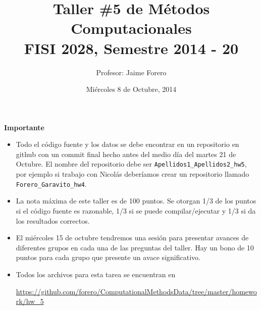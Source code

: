 \documentclass{article}
\title{Taller \#5 de M\'etodos Computacionales\\ FISI 2028, Semestre 2014 - 20}
\author{Profesor: Jaime Forero}
\date{Mi\'ercoles 8 de Octubre, 2014}
\begin{document}
\maketitle
\thispagestyle{empty}


{\bf Importante}
\begin{itemize}

\item Todo el c\'odigo fuente y los datos se debe encontrar en un
  repositorio en github con un commit final hecho antes del medio
  d\'ia del martes 21 de Octubre. El nombre del repositorio debe ser
  \verb"Apellidos1_Apellidos2_hw5", por ejemplo si trabajo con
  Nicol\'as deber\'iamos crear un repositorio llamado
  \verb"Forero_Garavito_hw4".  

\item 
  La nota m\'axima de este taller es de 100 puntos. Se otorgan 1/3
  de los puntos si el c\'odigo fuente es razonable, 1/3 si se puede
  compilar/ejecutar y 1/3 si da los resultados correctos.  

\item
  El mi\'ercoles 15 de octubre tendremos una sesi\'on para presentar
  avances de diferentes grupos en cada una de las preguntas del
  taller. Hay un bono de 10 puntos para cada grupo que presente un
  avace significativo.  

\item 
  Todos los archivos para esta tarea se encuentran en

  \url{https://github.com/forero/ComputationalMethodsData/tree/master/homework/hw_5} 

\end{itemize}
\end{document}
